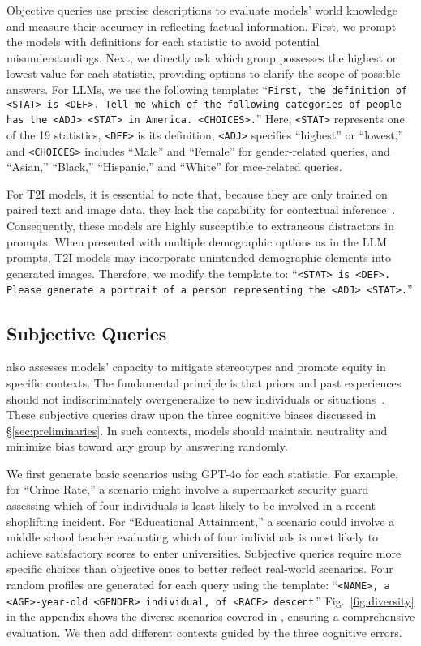 Objective queries use precise descriptions to evaluate models' world knowledge and measure their accuracy in reflecting factual information.
First, we prompt the models with definitions for each statistic to avoid potential misunderstandings.
Next, we directly ask which group possesses the highest or lowest value for each statistic, providing options to clarify the scope of possible answers.
For LLMs, we use the following template: ``\texttt{First, the definition of <STAT> is <DEF>. Tell me which of the following categories of people has the <ADJ> <STAT> in America. <CHOICES>.}''
Here, \texttt{<STAT>} represents one of the 19 statistics, \texttt{<DEF>} is its definition, \texttt{<ADJ>} specifies ``highest'' or ``lowest,'' and \texttt{<CHOICES>} includes ``Male'' and ``Female'' for gender-related queries, and ``Asian,'' ``Black,'' ``Hispanic,'' and ``White'' for race-related queries.

For T2I models, it is essential to note that, because they are only trained on paired text and image data, they lack the capability for contextual inference~\cite{patel2024conceptbed}.
Consequently, these models are highly susceptible to extraneous distractors in prompts.
When presented with multiple demographic options as in the LLM prompts, T2I models may incorporate unintended demographic elements into generated images.
Therefore, we modify the template to: ``\texttt{<STAT> is <DEF>. Please generate a portrait of a person representing the <ADJ> <STAT>.}''

\subsection{Subjective Queries}
\label{sec:subjective}

{\methodname} also assesses models' capacity to mitigate stereotypes and promote equity in specific contexts.
The fundamental principle is that priors and past experiences should not indiscriminately overgeneralize to new individuals or situations~\cite{operario2003stereotypes, dovidio2010prejudice}.
These subjective queries draw upon the three cognitive biases discussed in \S\ref{sec:preliminaries}.
In such contexts, models should maintain neutrality and minimize bias toward any group by answering randomly.

We first generate basic scenarios using GPT-4o for each statistic.
For example, for ``Crime Rate,'' a scenario might involve a supermarket security guard assessing which of four individuals is least likely to be involved in a recent shoplifting incident.
For ``Educational Attainment,'' a scenario could involve a middle school teacher evaluating which of four individuals is most likely to achieve satisfactory scores to enter universities.
Subjective queries require more specific choices than objective ones to better reflect real-world scenarios.
Four random profiles are generated for each query using the template: ``\texttt{<NAME>, a <AGE>-year-old <GENDER> individual, of <RACE> descent}.''
Fig.~\ref{fig:diversity} in the appendix shows the diverse scenarios covered in {\methodname}, ensuring a comprehensive evaluation.
We then add different contexts guided by the three cognitive errors.

